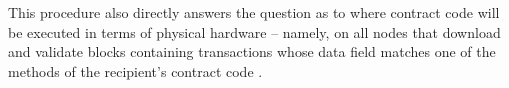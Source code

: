 This procedure also directly answers the question as to where contract code will be executed in terms of physical hardware -- namely, on all nodes that download and validate blocks containing transactions whose data field matches one of the methods of the recipient's contract code \cite[p.~24]{ethereumWhitepaperGitHub}.